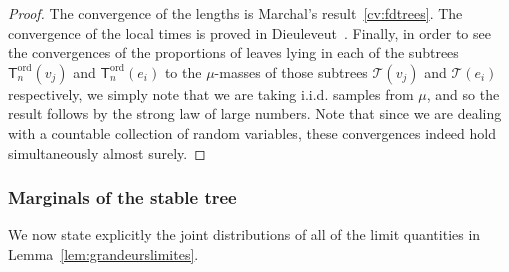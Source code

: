 \documentclass[AHL,Unicode,longabstracts,published]{cedram}
\newcommand{\ord}{\mathrm{ord}}
\newcommand{\cT}{\mathcal{T}}
\newcommand{\sT}{\mathsf{T}}
\begin{document}
\begin{proof}
The convergence of the lengths is Marchal's result~\eqref{cv:fdtrees}. The convergence of the local times is proved in Dieuleveut~\cite[Lemma~2.7 \& Lemma~2.8]{Dieuleveut15}. Finally, in order to see the convergences of the proportions of leaves lying in each of the subtrees $\sT_n^{\ord}(v_j)$ and $\sT_n^{\ord}(e_i)$ to the $\mu$-masses of those subtrees $\cT(v_j)$ and $\cT(e_i)$ respectively, we simply note that we are taking i.i.d. samples from $\mu$, and so the result follows by the strong law of large numbers. Note that since we are dealing with a countable collection of random variables, these convergences indeed hold simultaneously almost surely.
\end{proof}


\subsubsection{Marginals of the stable tree}\label{sec:marginalsstable}

We now state explicitly the joint distributions of all of the limit quantities in Lemma~\ref{lem:grandeurslimites}.
\end{document}
